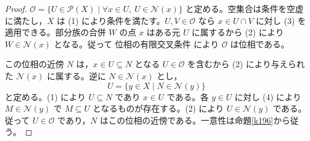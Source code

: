 \documentclass[a5paper,10pt,dvipdfmx]{jsarticle}
\theoremstyle{definition}
\theoremstyle{plain}
\newcommand{\Pow}{\mathcal{P}}
\newcommand{\GenronRefText}[2]{#2}
\begin{document}
\begin{proof}
$\mathcal O=\{U\in\Pow(X)\mid \forall x\in U,\ U\in\mathcal N(x)\}$ と定める。空集合は条件を空虚に満たし，$X$ は (1) により条件を満たす。$U,V\in\mathcal O$ なら $x\in U\cap V$ に対し (3) を適用できる。部分族の合併 $W$ の点 $x$ はある元 $U$ に属するから (2) により $W\in\mathcal N(x)$ となる。従って \GenronRefText{K-000147}{位相の有限交叉条件} により $\mathcal O$ は位相である。

この位相の近傍 $N$ は，$x\in U\subseteq N$ となる $U\in\mathcal O$ を含むから (2) により与えられた $\mathcal N(x)$ に属する。逆に $N\in\mathcal N(x)$ とし，
\[
 U=\{y\in X\mid N\in\mathcal N(y)\}
\]
と定める。(1) により $U\subseteq N$ であり $x\in U$ である。各 $y\in U$ に対し (4) により $M\in\mathcal N(y)$ で $M\subseteq U$ となるものが存在する。(2) により $U\in\mathcal N(y)$ である。従って $U\in\mathcal O$ であり，$N$ はこの位相の近傍である。一意性は命題\ref{k196}から従う。
\end{proof}
\end{document}

